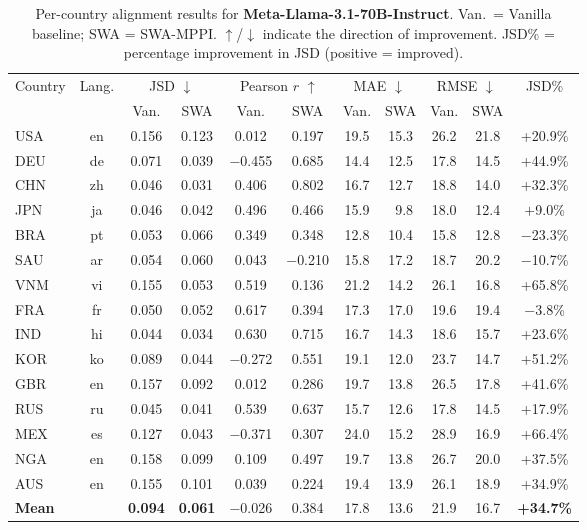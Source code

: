 \documentclass{article}
\begin{document}
\begin{table}[t]
\caption{Per-country alignment results for \textbf{Meta-Llama-3.1-70B-Instruct}.
    Van.\ = Vanilla baseline; SWA = SWA-MPPI. $\uparrow$/$\downarrow$ indicate
    the direction of improvement. JSD\% = percentage improvement in JSD
    (positive = improved).}
\label{tab:results_llama}
\centering
\setlength{\tabcolsep}{4pt}
\footnotesize
\begin{tabular}{lcccccccccc}
\toprule
\multirow{2}{*}{Country} & \multirow{2}{*}{Lang.}
  & \multicolumn{2}{c}{JSD $\downarrow$}
  & \multicolumn{2}{c}{Pearson $r$ $\uparrow$}
  & \multicolumn{2}{c}{MAE $\downarrow$}
  & \multicolumn{2}{c}{RMSE $\downarrow$}
  & JSD\% \\
\cmidrule(lr){3-4}\cmidrule(lr){5-6}\cmidrule(lr){7-8}\cmidrule(lr){9-10}
 & & Van. & SWA & Van. & SWA & Van. & SWA & Van. & SWA & \\
\midrule
USA & en    & 0.156 & 0.123 & 0.012 & 0.197 & 19.5 & 15.3 & 26.2 & 21.8 & +20.9\% \\
DEU & de    & 0.071 & 0.039 & $-$0.455 & 0.685 & 14.4 & 12.5 & 17.8 & 14.5 & +44.9\% \\
CHN & zh    & 0.046 & 0.031 & 0.406 & 0.802 & 16.7 & 12.7 & 18.8 & 14.0 & +32.3\% \\
JPN & ja    & 0.046 & 0.042 & 0.496 & 0.466 & 15.9 & ~9.8 & 18.0 & 12.4 & $+$9.0\% \\
BRA & pt    & 0.053 & 0.066 & 0.349 & 0.348 & 12.8 & 10.4 & 15.8 & 12.8 & $-$23.3\% \\
SAU & ar    & 0.054 & 0.060 & 0.043 & $-$0.210 & 15.8 & 17.2 & 18.7 & 20.2 & $-$10.7\% \\
VNM & vi    & 0.155 & 0.053 & 0.519 & 0.136 & 21.2 & 14.2 & 26.1 & 16.8 & +65.8\% \\
FRA & fr    & 0.050 & 0.052 & 0.617 & 0.394 & 17.3 & 17.0 & 19.6 & 19.4 & $-$3.8\% \\
IND & hi    & 0.044 & 0.034 & 0.630 & 0.715 & 16.7 & 14.3 & 18.6 & 15.7 & +23.6\% \\
KOR & ko    & 0.089 & 0.044 & $-$0.272 & 0.551 & 19.1 & 12.0 & 23.7 & 14.7 & +51.2\% \\
GBR & en    & 0.157 & 0.092 & 0.012 & 0.286 & 19.7 & 13.8 & 26.5 & 17.8 & +41.6\% \\
RUS & ru    & 0.045 & 0.041 & 0.539 & 0.637 & 15.7 & 12.6 & 17.8 & 14.5 & +17.9\% \\
MEX & es    & 0.127 & 0.043 & $-$0.371 & 0.307 & 24.0 & 15.2 & 28.9 & 16.9 & +66.4\% \\
NGA & en    & 0.158 & 0.099 & 0.109 & 0.497 & 19.7 & 13.8 & 26.7 & 20.0 & +37.5\% \\
AUS & en    & 0.155 & 0.101 & 0.039 & 0.224 & 19.4 & 13.9 & 26.1 & 18.9 & +34.9\% \\
\midrule
\textbf{Mean} & & \textbf{0.094} & \textbf{0.061} & $-$0.026 & 0.384 & 17.8 & 13.6 & 21.9 & 16.7 & \textbf{+34.7\%} \\
\bottomrule
\end{tabular}
\end{table}
\end{document}
